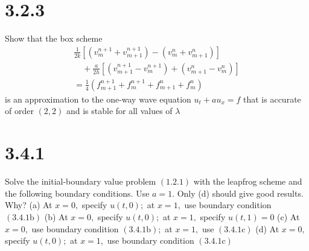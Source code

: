 \documentclass[12pt]{article}
\begin{document}
\section*{3.2.3}
Show that the box scheme
$$
\begin{array}{l}
{\frac{1}{2 k}\left[\left(v_{m}^{n+1}+v_{m+1}^{n+1}\right)-\left(v_{m}^{n}+v_{m+1}^{n}\right)\right]} \\
{\quad+\frac{a}{2 h}\left[\left(v_{m+1}^{n+1}-v_{m}^{n+1}\right)+\left(v_{m+1}^{n}-v_{m}^{n}\right)\right]} \\
{=\frac{1}{4}\left(f_{m+1}^{n+1}+f_{m}^{n+1}+f_{m+1}^{n}+f_{m}^{n}\right)}
\end{array}
$$
is an approximation to the one-way wave equation $u_{t}+a u_{x}=f$ that is accurate of order $(2,2)$ and is stable for all values of $\lambda$

\section*{3.4.1}
Solve the initial-boundary value problem $(1.2 .1)$ with the leapfrog scheme and the following boundary conditions. Use $a=1 .$ Only (d) should give good results. Why?
(a) At $x=0,$ specify $u(t, 0) ;$ at $x=1,$ use boundary condition $(3.4 .1 \mathrm{b})$
(b) At $x=0,$ specify $u(t, 0) ;$ at $x=1,$ specify $u(t, 1)=0$
(c) At $x=0,$ use boundary condition $(3.4 .1 \mathrm{b}) ;$ at $x=1,$ use $(3.4 .1 \mathrm{c})$
(d) At $x=0,$ specify $u(t, 0) ;$ at $x=1,$ use boundary condition $(3.4 .1 \mathrm{c})$
\end{document}
